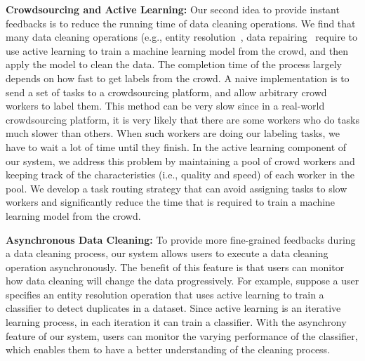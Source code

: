 \vspace{.5em}
{\noindent \bf Crowdsourcing and Active Learning:} Our second idea to provide instant feedbacks is to reduce the running time of data cleaning operations. We find that many data cleaning operations (e.g., entity resolution~\cite{DBLP:journals/pvldb/YakoutENOI11}, data repairing~\cite{DBLP:journals/pvldb/MozafariSFJM14} require to use active learning to train a machine learning model from the crowd, and then apply the model to clean the data. The completion time of the process largely depends on how fast to get labels from the crowd. A naive implementation is to send a set of tasks to a crowdsourcing platform, and allow arbitrary crowd workers to label them. This method can be very slow since in a real-world crowdsourcing platform, it is very likely that there are some workers who do tasks much slower than others. When such workers are doing our labeling tasks, we have to wait a lot of time until they finish. In the active learning component of our system, we address this problem by maintaining a pool of crowd workers and keeping track of the characteristics (i.e., quality and speed) of each worker in the pool. We develop a task routing strategy that can avoid assigning tasks to slow workers and significantly reduce the time that is required to train a machine learning model from the crowd.



\vspace{.5em}
{\noindent \bf Asynchronous Data Cleaning:} To provide more fine-grained feedbacks during a data cleaning process, our system allows users to execute a data cleaning operation asynchronously. The benefit of this feature is that users can monitor how data cleaning will change the data progressively. For example, suppose a user specifies an entity resolution operation that uses active learning to train a classifier to detect duplicates in a dataset. Since active learning is an iterative learning process, in each iteration it can train a classifier. With the asynchrony feature of our system, users can monitor the varying performance of the classifier, which enables them to have a better understanding of the cleaning process.








